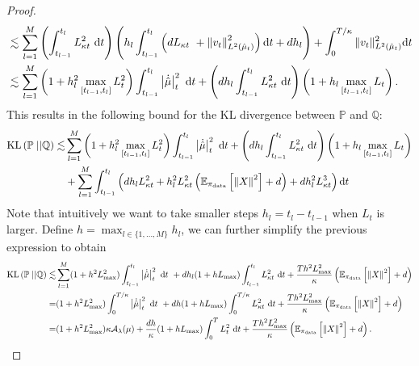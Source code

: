 \begin{proof}
\begin{align}
   &\lesssim \sum_{l=1}^M \left(\int_{t_{l-1}}^{t_l}L_{\kappa t}^2 \ \md t\right) \left(h_l \int_{t_{l-1}}^{t_l} \left(d L_{\kappa t}\ + \left\Vert v_t \right\Vert_{L^2({\hat{\mu}}_t)}^2\right)\md t  + d h_l\right)+ \int_0^{T/\kappa} \Vert v_t\Vert^2_{L^2({\hat{\mu}}_t)} \md t \nonumber\\
   &\lesssim \sum_{l=1}^M \left( 1 + h_l^2\max_{[t_{l-1}, t_l]}L_{t}^2\right)
   \int_{t_{l-1}}^{t_l} \left\vert\Dot{\hat{\mu}}\right\vert_t^2\ \md t + \left(d h_l\int_{t_{l-1}}^{t_l}L_{\kappa t}^2 \ \md t\right) \left(1 + h_l\max_{[t_{l-1}, t_l]}L_{t}\right). \label{eq:intermediate_bound_discretisation_paths}
\end{align}
This results in the following bound for the \gls*{KL} divergence between $\mathbb{P}$ and $\mathbb{Q}$:
\begin{align*}
    \operatorname*{KL}\left(\mathbb{P}\;||\mathbb{Q}\right)\lesssim& \sum_{l=1}^M \left( 1 + h_l^2\max_{[t_{l-1}, t_l]} L_{t}^2\right)
   \int_{t_{l-1}}^{t_l} \left\vert\Dot{\hat{\mu}}\right\vert_t^2\ \mathrm{d} t + \left(d h_l\int_{t_{l-1}}^{t_l} L_{\kappa t}^2 \ \mathrm{d} t\right) \left(1 + h_l\max_{[t_{l-1}, t_l]} L_{t}\right) \\
   & + \sum_{l=1}^M\int_{t_{l-1}}^{t_l} \left(d h_l L_{\kappa t}^2 + h_l^2 L_{\kappa t}^2 \left(\mathbb{E}_{\operatorname*{\pi_{\text{data}}}}\left[\left\Vert X\right\Vert^2\right] + d\right) + dh_l^2  L_{\kappa t}^3\right)\mathrm{d} t
\end{align*}
Note that intuitively we want to take smaller steps $h_l= t_l-t_{l-1}$ when $L_t$ is larger. 
Define $h = \max_{l\in\{1, \dots, M\}} h_l$, we can further simplify the previous expression to obtain
\begin{align*}
    \kl\left(\mathbb{P}\;||\mathbb{Q}\right)\lesssim &\sum_{l=1}^M (1+h^2 L_{\max}^2)\int_{t_{l-1}}^{t_l} \left\vert\Dot{\hat{\mu}}\right\vert_t^2 \ \md t\ + d h_l(1+ h L_{\max}) \int_{t_{l-1}}^{t_l}L_{\kappa t}^2 \ \md t+ \frac{Th^2L_{\max}^2}{\kappa}\left(\mathbb{E}_{\pid}\left[\left\Vert X\right\Vert^2\right] + d\right)\\
     =& (1+h^2 L_{\max}^2) \int_{0}^{T/\kappa} \left\vert\Dot{\hat{\mu}}\right\vert_t^2 \ \md t\ + 
 d h(1+ h L_{\max})\int_{0}^{T/\kappa} L_{\kappa t}^2 \ \md t+ \frac{Th^2 L_{\max}^2}{\kappa}\left(\mathbb{E}_{\pid}\left[\left\Vert X\right\Vert^2\right] + d\right)\\
 =&  (1+h^2 L_{\max}^2) \kappa \mathcal{A}_{\lambda}(\mu)  + 
\frac{d h}{\kappa} (1+ hL_{\max})\int_{0}^{T}L_{ t}^2 \ \md t+ \frac{Th^2L_{\max}^2}{\kappa} \left(\mathbb{E}_{\pid}\left[\left\Vert X\right\Vert^2\right] + d\right).

\end{align*}
\end{proof}
